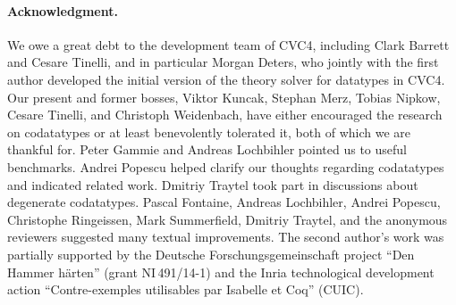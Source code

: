 \documentclass[smallcondensed,draft]{svjour3}
\begin{document}

{
\footnotesize
\def\ackname{Acknowledgment}
\paragraph{\footnotesize\ackname.}
We owe a great debt to the development team of CVC4,
including Clark Barrett and Cesare Tinelli,
and in particular Morgan Deters,
who jointly with the first author
developed the initial version
of the theory solver for datatypes in CVC4.
%
Our present and former bosses, Viktor Kuncak, Stephan Merz, Tobias Nipkow,
Cesare Tinelli, and Christoph Weidenbach, have either encouraged the research on
codatatypes or at least benevolently tolerated it, both of which we are thankful
for.
%
Peter Gammie and Andreas Lochbihler pointed us to useful benchmarks.
Andrei Popescu helped clarify our thoughts regarding codatatypes and indicated
related work. Dmitriy Traytel took part in discussions about degenerate
codatatypes.
%
Pascal Fontaine, Andreas Lochbihler, Andrei Popescu, Christophe Ringeissen, Mark
Summerfield, Dmitriy Traytel, and the anonymous reviewers suggested many
textual improvements. The second author's work was partially supported by
the Deutsche
Forschungs\-gemein\-schaft %
project ``Den Hammer h\"arten'' (grant NI\,491\slash 14-1)
and the Inria technological development
action ``Contre-exemples utilisables par Isabelle et Coq'' (CUIC).

}


{}
\end{document}
